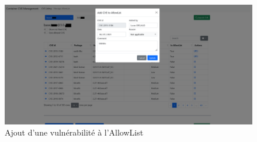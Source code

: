 \begin{figure}[h]
    \centering
    \includegraphics[width=0.9\linewidth]{resources/img/cont_mgnt_add_cve.png}
    \caption{Ajout d'une vulnérabilité à l'AllowList}
\end{figure}

